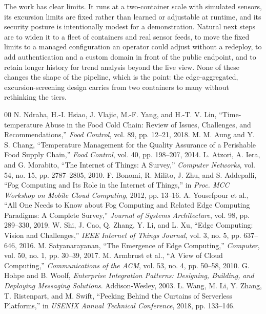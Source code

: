 \documentclass[conference]{IEEEtran}
\begin{document}
The work has clear limits. It runs at a two-container scale with simulated sensors, its excursion limits are fixed rather than learned or adjustable at runtime, and its security posture is intentionally modest for a demonstration. Natural next steps are to widen it to a fleet of containers and real sensor feeds, to move the fixed limits to a managed configuration an operator could adjust without a redeploy, to add authentication and a custom domain in front of the public endpoint, and to retain longer history for trend analysis beyond the live view. None of these changes the shape of the pipeline, which is the point: the edge-aggregated, excursion-screening design carries from two containers to many without rethinking the tiers.

\begin{thebibliography}{00}
 N. Ndraha, H.-I. Hsiao, J. Vlajic, M.-F. Yang, and H.-T. V. Lin, ``Time-temperature Abuse in the Food Cold Chain: Review of Issues, Challenges, and Recommendations,'' \emph{Food Control}, vol. 89, pp. 12--21, 2018.
 M. M. Aung and Y. S. Chang, ``Temperature Management for the Quality Assurance of a Perishable Food Supply Chain,'' \emph{Food Control}, vol. 40, pp. 198--207, 2014.
 L. Atzori, A. Iera, and G. Morabito, ``The Internet of Things: A Survey,'' \emph{Computer Networks}, vol. 54, no. 15, pp. 2787--2805, 2010.
 F. Bonomi, R. Milito, J. Zhu, and S. Addepalli, ``Fog Computing and Its Role in the Internet of Things,'' in \emph{Proc. MCC Workshop on Mobile Cloud Computing}, 2012, pp. 13--16.
 A. Yousefpour et al., ``All One Needs to Know about Fog Computing and Related Edge Computing Paradigms: A Complete Survey,'' \emph{Journal of Systems Architecture}, vol. 98, pp. 289--330, 2019.
 W. Shi, J. Cao, Q. Zhang, Y. Li, and L. Xu, ``Edge Computing: Vision and Challenges,'' \emph{IEEE Internet of Things Journal}, vol. 3, no. 5, pp. 637--646, 2016.
 M. Satyanarayanan, ``The Emergence of Edge Computing,'' \emph{Computer}, vol. 50, no. 1, pp. 30--39, 2017.
 M. Armbrust et al., ``A View of Cloud Computing,'' \emph{Communications of the ACM}, vol. 53, no. 4, pp. 50--58, 2010.
 G. Hohpe and B. Woolf, \emph{Enterprise Integration Patterns: Designing, Building, and Deploying Messaging Solutions}. Addison-Wesley, 2003.
 L. Wang, M. Li, Y. Zhang, T. Ristenpart, and M. Swift, ``Peeking Behind the Curtains of Serverless Platforms,'' in \emph{USENIX Annual Technical Conference}, 2018, pp. 133--146.

\end{thebibliography}
\end{document}
